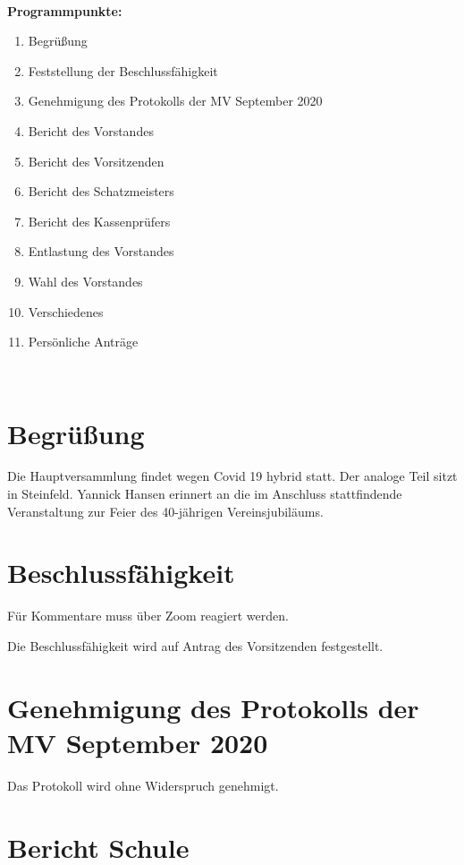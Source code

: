 \documentclass[a4paper, 11pt]{article}
\begin{document}
\makebox[\linewidth]{\rule{\linewidth}{0.4pt}}\\
\textbf{Programmpunkte:} 
\begin{enumerate}
\item Begrüßung
\item Feststellung der Beschlussfähigkeit
\item Genehmigung des Protokolls der MV September 2020
\item Bericht des Vorstandes
\item Bericht des Vorsitzenden
\item Bericht des Schatzmeisters
\item Bericht des Kassenprüfers
\item Entlastung des Vorstandes
\item Wahl des Vorstandes
\item Verschiedenes
\item Persönliche Anträge
\end{enumerate}
\makebox[\linewidth]{\rule{\linewidth}{0.4pt}}\\

\newpage

\section*{Begrüßung}

Die Hauptversammlung findet wegen Covid 19 hybrid statt. Der analoge Teil sitzt in Steinfeld.
Yannick Hansen erinnert an die im Anschluss stattfindende Veranstaltung zur Feier des 40-jährigen Vereinsjubiläums.


\section*{Beschlussfähigkeit}

Für Kommentare muss über Zoom reagiert werden.

Die Beschlussfähigkeit wird auf Antrag des Vorsitzenden festgestellt.

\section*{Genehmigung des Protokolls der MV September 2020}

Das Protokoll wird ohne Widerspruch genehmigt.

\section*{Bericht Schule}
\end{document}
